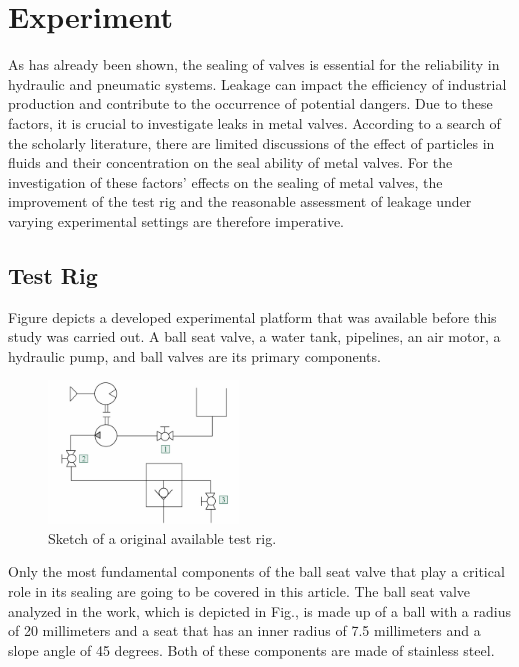 \chapter{Experiment}
\label{ch:Experiment}
As has already been shown, the sealing of valves is essential for the reliability in hydraulic and pneumatic systems. Leakage can impact the efficiency
 of industrial production and contribute to the occurrence of potential dangers. 
Due to these factors, it is crucial to investigate leaks in metal valves. According to a search 
of the scholarly literature, there are limited discussions of the effect of particles in fluids 
and their concentration on the seal ability of metal valves. For the investigation of these 
factors' effects on the sealing of metal valves, the improvement of the test rig and the 
reasonable assessment of leakage under varying experimental settings are therefore imperative.

\section{Test Rig}
\label{Test Rig}

Figure  depicts a developed experimental platform that was available before this study 
was carried out. A ball seat valve, a water tank, pipelines, an air motor, a hydraulic pump,
and ball valves are its primary components.\\


\begin{figure}[htbp]
    \centering
    \includegraphics[width=0.45\textwidth]{figures/TestRig/oldTestRig.jpg}
    \caption{Sketch of a original available test rig.}
    \label{fig:oldTestRig}
\end{figure}


Only the most fundamental components of the ball seat valve that play a critical role in its sealing 
are going to be covered in this article. The ball seat valve analyzed in the work, which is depicted 
in Fig., is made up of a ball with a radius of 20 millimeters and a seat that has an
inner radius of 7.5 millimeters and a slope angle of 45 degrees. 
Both of these components are made of stainless steel.\\

